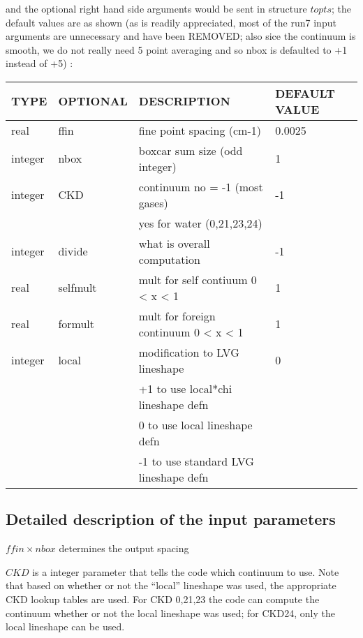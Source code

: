 \documentclass[11pt]{article}
\begin{document}
and the optional right hand side arguments would be sent in structure $topts$;
the default values are as shown (as is readily appreciated, most of the run7
input arguments are unnecessary and have been REMOVED; also sice the continuum
is smooth, we do not really need 5 point averaging and so nbox is defaulted to
+1 instead of +5) : 
\begin{longtable}{llll}
\hline
\hline
  TYPE  &   OPTIONAL &         DESCRIPTION  &            DEFAULT VALUE\\
\hline
\hline
real   &  ffin    &      fine point spacing (cm-1)    &   0.0025\\
integer & nbox     &     boxcar sum size (odd integer) &  1\\
\hline
integer&  CKD       &    continuum no  = -1 (most gases) &  -1\\
       &            &    yes for water (0,21,23,24)      &  \\
\hline
integer &  divide  &      what is overall computation    &   -1 \\
real    &  selfmult &       mult for self contiuum      0 < x < 1 & 1\\
real    &  formult  &       mult for foreign continuum  0 < x < 1 & 1\\
\hline
integer & local &         modification to LVG lineshape            &  0 \\
        &       &         +1 to use local*chi lineshape defn       &    \\
        &       &          0 to use local lineshape defn           &    \\
        &       &         -1 to use standard LVG lineshape defn    &    \\
\hline
\hline
\end{longtable}

\subsection{Detailed description of the input parameters}

$ffin\times nbox$ determines the output spacing

$CKD$ is a integer parameter that tells the code which continuum to use. 
Note that based on whether or not the ``local'' lineshape was used, the 
appropriate CKD lookup tables are used. For CKD 0,21,23 the code can 
compute the continuum whether or not the local lineshape was used; for 
CKD24, only the local lineshape can be used.
\end{document}
